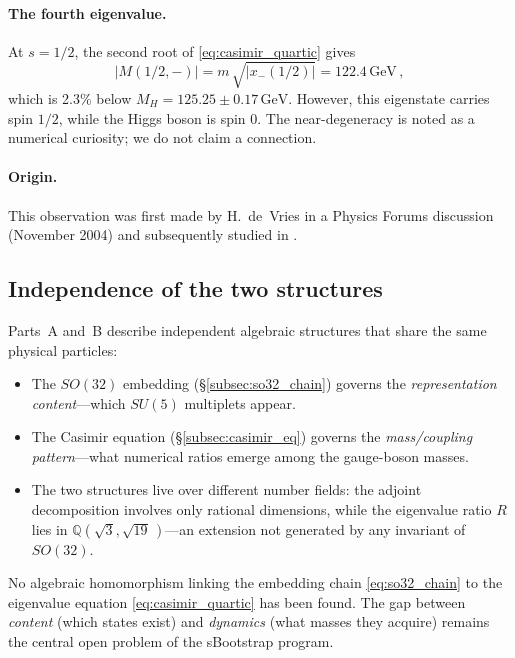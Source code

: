 \documentclass[12pt,a4paper]{article}
\newcommand{\GeV}{\,\text{GeV}}
\begin{document}
\paragraph{The fourth eigenvalue.}
At $s = 1/2$, the second root of \eqref{eq:casimir_quartic} gives
\begin{equation}
|M(1/2, -)|
  = m\,\sqrt{|x_-(1/2)|}
  = 122.4\GeV\,,
\end{equation}
which is 2.3\% below $M_H = 125.25 \pm 0.17\GeV$.  However,
this eigenstate carries spin $1/2$, while the Higgs boson is
spin $0$.  The near-degeneracy is noted as a numerical curiosity;
we do not claim a connection.

\paragraph{Origin.}
This observation was first made by H.~de~Vries in a Physics
Forums discussion (November 2004) and subsequently studied in
\cite{Rivero2005, Rivero2005b}.

\subsection{Independence of the two structures}
\label{subsec:two_gap}

Parts~A and~B describe independent algebraic structures that share
the same physical particles:
\begin{itemize}
\item The $SO(32)$ embedding (\S\ref{subsec:so32_chain}) governs
  the \emph{representation content}---which $SU(5)$ multiplets
  appear.
\item The Casimir equation (\S\ref{subsec:casimir_eq}) governs
  the \emph{mass/coupling pattern}---what numerical ratios emerge
  among the gauge-boson masses.
\item The two structures live over different number fields:
  the adjoint decomposition involves only rational
  dimensions, while the eigenvalue ratio $R$ lies in
  $\mathbb{Q}(\sqrt{3},\sqrt{19}\,)$---an extension not
  generated by any invariant of $SO(32)$.
\end{itemize}
No algebraic homomorphism linking the embedding chain
\eqref{eq:so32_chain} to the eigenvalue equation
\eqref{eq:casimir_quartic} has been found.  The gap between
\emph{content} (which states exist) and \emph{dynamics}
(what masses they acquire) remains the central open problem of
the sBootstrap program.
\end{document}
